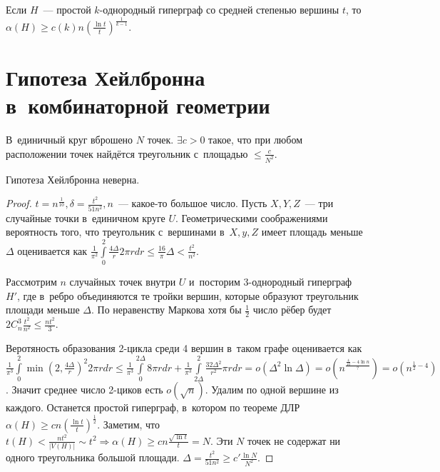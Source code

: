 \documentclass{article}
\begin{document}
\begin{corollary}
	Если $H$~--- простой $k$-однородный гиперграф со средней степенью вершины $t$,
	то $\alpha(H) \ge c(k) n \left( \frac{\ln t}{t}\right)^\frac{1}{k-1}$.
\end{corollary}

\section{Гипотеза Хейлбронна в~комбинаторной геометрии}

В~единичный круг вброшено $N$ точек. $\exists c > 0$ такое, что при любом
расположении точек найдётся треугольник с~площадью $\le \frac{c}{N^2}$.

\begin{claim}
	Гипотеза Хейлбронна неверна.
\end{claim}
\begin{proof}
	$t = n^{\frac{1}{10}}, \delta = \frac{t^2}{51n^2}, n$~--- какое-то большое
	число. Пусть $X, Y, Z$~--- три случайные точки в~единичном круге $U$.
	Геометрическими соображениями вероятность того, что треугольник с~вершинами
	в~$X, y, Z$ имеет площадь меньше $\Delta$ оценивается как
	$\frac{1}{\pi^2} \int\limits_0^2 \frac{4\Delta}{r} 2\pi r dr \le
	\frac{16}{\pi}\Delta < \frac{t^2}{n^2}$.

	Рассмотрим $n$ случайных точек внутри $U$ и~посторим 3-однородный гиперграф
	$H'$, где в~ребро объединяются те тройки вершин, которые образуют треугольник
	площади меньше $\Delta$. По неравенству Маркова хотя бы $\frac{1}{2}$ число
	рёбер будет $2C_n^3 \frac{t^2}{n^2} \le \frac{nt^2}{3}$.

	Веротяность образования 2-цикла среди 4 вершин в~таком графе оценивается как
	$\frac{1}{\pi^3} \int\limits_0^2 \min\left(2, \frac{4\Delta}{r}\right)^2 2\pi
	r dr \le \frac{1}{\pi^3} \int\limits_0^{2\Delta} 8\pi r dr +
	\frac{1}{\pi^3}\int\limits_{2\Delta}^2 \frac{32\Delta^2}{r^2}\pi r dr =
	o(\Delta^2 \ln \Delta) = o\left(n^\frac{\frac{4}{10}-4 \ln n}{?}\right) =
	o(n^{\frac{1}{2} - 4})$. Значит среднее число 2-циков есть $o(\sqrt{n})$.
	Удалим по одной вершине из каждого. Останется простой гиперграф, в~котором по
	теореме ДЛР $\alpha(H) \ge c n \left(\frac{\ln t}{t}\right)^{\frac{1}{2}}$.
	Заметим, что $t(H) < \frac{nt^2}{|V(H)|} \sim t^2 \Rightarrow \alpha(H) \ge
	cn \frac{\sqrt{\ln t}}{t} = N$. Эти $N$ точек не содержат ни одного
	треугольника большой площади.  $\Delta = \frac{t^2}{51n^2} \ge c'
	\frac{\ln N}{N^2}$.
\end{proof}
\end{document}
